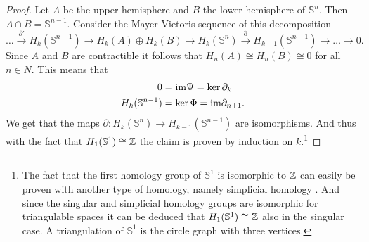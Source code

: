 \begin{proof}
  Let $A$ be the upper hemisphere and $B$ the lower hemisphere of $\mathbb{S}^n$. Then $A\cap B = \mathbb{S}^{n-1}$. Consider the Mayer-Vietoris sequence of this decomposition
  \begin{equation*}
    \ldots \overset{\partial'}{\to} H_k(\mathbb{S}^{n-1}) \to H_k(A) \oplus H_k(B) \to H_k(\mathbb{S}^n) \overset{\partial}{\to} H_{k-1}(\mathbb{S}^{n-1}) \to \ldots \to 0.
  \end{equation*}
  Since $A$ and $B$ are contractible it follows that $H_n(A) \cong H_n(B) \cong 0$ for all $n \in N$. This means that
  \begin{align*}
    0 &= {\rm im} \Psi = \ker \partial_k \\
    H_k(\mathbb{S}^{n-1}) &= \ker \Phi = {\rm im} \partial_{n+1}.
  \end{align*}
  We get that the maps $\partial\colon H_k(\mathbb{S}^n) \to H_{k-1}(\mathbb{S}^{n-1})$ are isomorphisms. And thus with the fact that $H_1(\mathbb{S}^1) \cong \mathbb{Z}$ the claim is proven by induction on $k$.\footnote{The fact that the first homology group of $\mathbb{S}^1$ is isomorphic to $\mathbb{Z}$ can easily be proven with another type of homology, namely simplicial homology \cite[p. 106]{hatcher}. And since the singular and simplicial homology groups are isomorphic for triangulable spaces it can be deduced that $H_1(\mathbb{S}^1) \cong \mathbb{Z}$ also in the singular case. A triangulation of $\mathbb{S}^1$ is the circle graph with three vertices.}
\end{proof}
